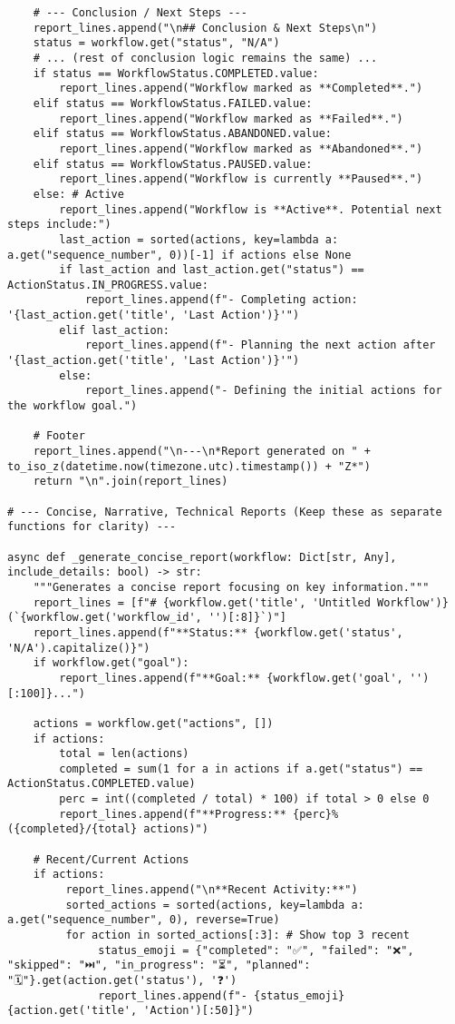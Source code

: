 \documentclass[12pt,a4paper]{article}
\begin{document}
\begin{pageablecode}
\begin{verbatim}
    # --- Conclusion / Next Steps ---
    report_lines.append("\n## Conclusion & Next Steps\n")
    status = workflow.get("status", "N/A")
    # ... (rest of conclusion logic remains the same) ...
    if status == WorkflowStatus.COMPLETED.value:
        report_lines.append("Workflow marked as **Completed**.")
    elif status == WorkflowStatus.FAILED.value:
        report_lines.append("Workflow marked as **Failed**.")
    elif status == WorkflowStatus.ABANDONED.value: 
        report_lines.append("Workflow marked as **Abandoned**.")
    elif status == WorkflowStatus.PAUSED.value:
        report_lines.append("Workflow is currently **Paused**.")
    else: # Active
        report_lines.append("Workflow is **Active**. Potential next steps include:")
        last_action = sorted(actions, key=lambda a: a.get("sequence_number", 0))[-1] if actions else None
        if last_action and last_action.get("status") == ActionStatus.IN_PROGRESS.value:
            report_lines.append(f"- Completing action: '{last_action.get('title', 'Last Action')}'")
        elif last_action:
            report_lines.append(f"- Planning the next action after '{last_action.get('title', 'Last Action')}'")
        else: 
            report_lines.append("- Defining the initial actions for the workflow goal.")

    # Footer
    report_lines.append("\n---\n*Report generated on " + to_iso_z(datetime.now(timezone.utc).timestamp()) + "Z*")
    return "\n".join(report_lines)

# --- Concise, Narrative, Technical Reports (Keep these as separate functions for clarity) ---

async def _generate_concise_report(workflow: Dict[str, Any], include_details: bool) -> str:
    """Generates a concise report focusing on key information."""
    report_lines = [f"# {workflow.get('title', 'Untitled Workflow')} (`{workflow.get('workflow_id', '')[:8]}`)"]
    report_lines.append(f"**Status:** {workflow.get('status', 'N/A').capitalize()}")
    if workflow.get("goal"): 
        report_lines.append(f"**Goal:** {workflow.get('goal', '')[:100]}...")

    actions = workflow.get("actions", [])
    if actions:
        total = len(actions)
        completed = sum(1 for a in actions if a.get("status") == ActionStatus.COMPLETED.value)
        perc = int((completed / total) * 100) if total > 0 else 0
        report_lines.append(f"**Progress:** {perc}% ({completed}/{total} actions)")

    # Recent/Current Actions
    if actions:
         report_lines.append("\n**Recent Activity:**")
         sorted_actions = sorted(actions, key=lambda a: a.get("sequence_number", 0), reverse=True)
         for action in sorted_actions[:3]: # Show top 3 recent
              status_emoji = {"completed": "✅", "failed": "❌", "skipped": "⏭️", "in_progress": "⏳", "planned": "🗓️"}.get(action.get('status'), '❓')
              report_lines.append(f"- {status_emoji} {action.get('title', 'Action')[:50]}")


\end{verbatim}
\end{pageablecode}
\end{document}
